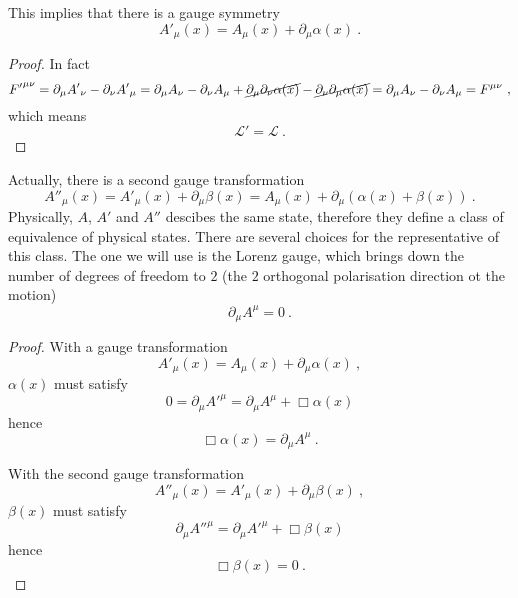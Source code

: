     This implies that there is a gauge symmetry 
    \begin{equation*}
        {A'}_\mu (x) = A_\mu (x) + \partial_\mu \alpha (x) ~.
    \end{equation*}
    \begin{proof}
        In fact 
        \begin{equation*}
            {F'}^{\mu\nu} = \partial_\mu {A'}_\nu - \partial_\nu {A'}_\mu = \partial_\mu A_\nu - \partial_\nu A_\mu + \cancel{\partial_\mu \partial_\nu \alpha(x)} - \cancel{\partial_\nu \partial_\mu \alpha(x)} = \partial_\mu A_\nu - \partial_\nu A_\mu = F^{\mu\nu} ~,
        \end{equation*}
        which means 
        \begin{equation*}
            \mathcal L' = \mathcal L ~.
        \end{equation*}
    \end{proof}

    Actually, there is a second gauge transformation 
    \begin{equation*}
        {A''}_\mu (x) = {A'}_\mu (x) + \partial_\mu \beta (x) = A_\mu (x) + \partial_\mu (\alpha (x) + \beta (x) ) ~.
    \end{equation*}
    Physically, $A$, $A'$ and $A''$ descibes the same state, therefore they define a class of equivalence of physical states. There are several choices for the representative of this class. The one we will use is the Lorenz gauge, which brings down the number of degrees of freedom to $2$ (the $2$ orthogonal polarisation direction ot the motion)
    \begin{equation*}
        \partial_\mu A^\mu = 0 ~.
    \end{equation*}
    \begin{proof}
        With a gauge transformation 
        \begin{equation*}
            {A'}_\mu (x) = A_\mu (x) + \partial_\mu \alpha (x) ~,
        \end{equation*}
        $\alpha (x)$ must satisfy 
        \begin{equation*}
            0 = \partial_\mu {A'}^\mu = \partial_\mu A^\mu + \Box \alpha (x)
        \end{equation*}
        hence 
        \begin{equation*}
            \Box \alpha(x) = \partial_\mu A^\mu ~.
        \end{equation*}

        With the second gauge transformation 
        \begin{equation*}
            {A''}_\mu (x) = {A'}_\mu (x) + \partial_\mu \beta (x) ~,
        \end{equation*}
        $\beta (x)$ must satisfy 
        \begin{equation*}
            \partial_\mu {A''}^\mu = \partial_\mu {A'}^\mu + \Box \beta (x)
        \end{equation*}
        hence 
        \begin{equation*}
            \Box \beta(x) = 0 ~.
        \end{equation*}
    \end{proof}

